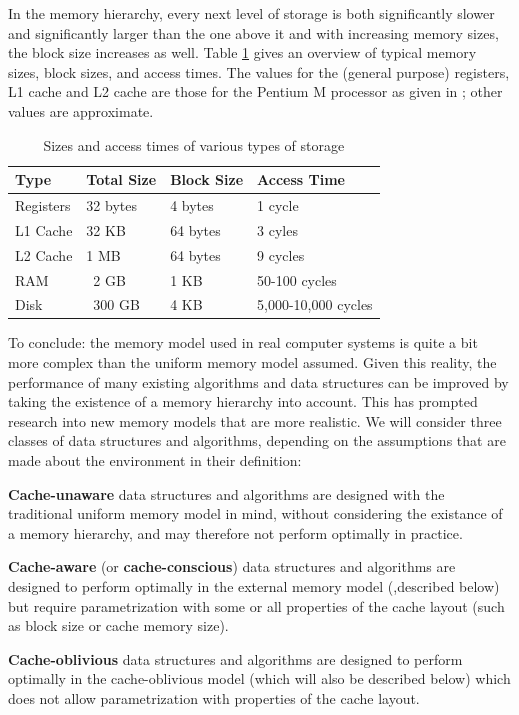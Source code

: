 \documentclass{acm_proc_article-sp}
\begin{document}
In the memory hierarchy, every next level of storage is both significantly slower and significantly larger than the one above it and with increasing memory sizes, the block size increases as well. Table \ref{tab-memhier} gives an overview of typical memory sizes, block sizes, and access times. The values for the (general purpose) registers, L1 cache and L2 cache are those for the Pentium M processor as given in \cite{intel-opt}; other values are approximate.

\begin{table}
\begin{center}
\begin{tabular}{ l l l l }
\hline
\textbf{Type} & \textbf{Total Size} & \textbf{Block Size} & \textbf{Access Time} \\
\hline
Registers  &   32 bytes & 4 bytes & 1 cycle \\
L1 Cache   &   32 KB    & 64 bytes & 3 cyles \\
L2 Cache   &    1 MB    & 64 bytes & 9 cycles \\
RAM        &   ~2 GB    & 1 KB     & 50-100 cycles \\
Disk       & ~300 GB    & 4 KB     & 5,000-10,000 cycles \\
\hline
\end{tabular}
\caption{Sizes and access times of various types of storage}
\label{tab-memhier}
\end{center}
\end{table}

To conclude: the memory model used in real computer systems is quite a bit more complex than the uniform memory model assumed. Given this reality, the performance of many existing algorithms and data structures can be improved by taking the existence of a memory hierarchy into account. This has prompted research into new memory models that are more realistic. We will consider three classes of data structures and algorithms, depending on the assumptions that are made about the environment in their definition:
\begin{list}{}{}
\item \textbf{Cache-unaware} data structures and algorithms are designed with the traditional uniform memory model in mind, without considering the existance of a memory hierarchy, and may therefore not perform optimally in practice.
\item \textbf{Cache-aware} (or \textbf{cache-conscious}) data structures and algorithms are designed to perform optimally in the external memory model (,described below) but require parametrization with some or all properties of the cache layout (such as block size or cache memory size).
\item \textbf{Cache-oblivious} data structures and algorithms are designed to perform optimally in the cache-oblivious model (which will also be described below) which does not allow parametrization with properties of the cache layout.
\end{list}
\end{document}
